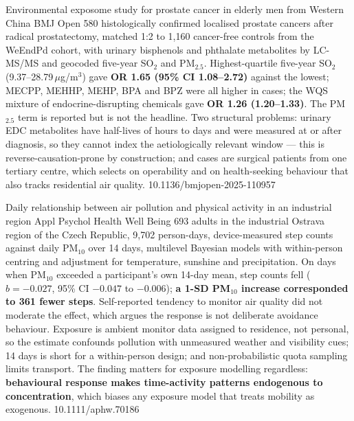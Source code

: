 \documentclass[10pt]{article}
\begin{document}
{Environmental exposome study for prostate cancer in elderly men from Western China}
{BMJ Open}
{580 histologically confirmed localised prostate cancers after radical prostatectomy,
matched 1:2 to 1,160 cancer-free controls from the WeEndPd cohort, with urinary
bisphenols and phthalate metabolites by LC-MS/MS and geocoded five-year SO$_2$ and
PM$_{2.5}$. Highest-quartile five-year SO$_2$ (9.37--28.79\,$\mu$g/m$^3$) gave
\textbf{OR 1.65 (95\% CI 1.08--2.72)} against the lowest; MECPP, MEHHP, MEHP, BPA and BPZ
were all higher in cases; the WQS mixture of endocrine-disrupting chemicals gave
\textbf{OR 1.26 (1.20--1.33)}. The PM$_{2.5}$ term is reported but is not the headline.
Two structural problems: urinary EDC metabolites have half-lives of hours to days and
were measured at or after diagnosis, so they cannot index the aetiologically relevant
window --- this is reverse-causation-prone by construction; and cases are surgical
patients from one tertiary centre, which selects on operability and on health-seeking
behaviour that also tracks residential air quality.}
{10.1136/bmjopen-2025-110957}

{Daily relationship between air pollution and physical activity in an industrial region}
{Appl Psychol Health Well Being}
{693 adults in the industrial Ostrava region of the Czech Republic, 9,702 person-days,
device-measured step counts against daily PM$_{10}$ over 14 days, multilevel Bayesian
models with within-person centring and adjustment for temperature, sunshine and
precipitation. On days when PM$_{10}$ exceeded a participant's own 14-day mean, step
counts fell ($b = -0.027$, 95\% CI $-0.047$ to $-0.006$); \textbf{a 1-SD PM$_{10}$
increase corresponded to 361 fewer steps}. Self-reported tendency to monitor air quality
did not moderate the effect, which argues the response is not deliberate avoidance
behaviour. Exposure is ambient monitor data assigned to residence, not personal, so the
estimate confounds pollution with unmeasured weather and visibility cues; 14 days is
short for a within-person design; and non-probabilistic quota sampling limits transport.
The finding matters for exposure modelling regardless: \textbf{behavioural response makes
time-activity patterns endogenous to concentration}, which biases any exposure model that
treats mobility as exogenous.}
{10.1111/aphw.70186}

\end{document}
